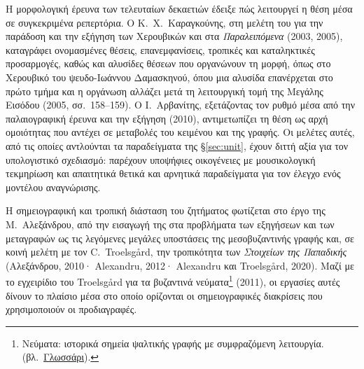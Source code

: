 \documentclass[a4paper]{article}
\newcommand{\musnote}[2]{\footnote{#2\enspace(βλ.~\hyperlink{gl:#1}{Γλωσσάρι}).}}
\begin{document}
Η μορφολογική έρευνα των τελευταίων δεκαετιών έδειξε πώς λειτουργεί η θέση μέσα σε συγκεκριμένα ρεπερτόρια. Ο Κ.~Χ.~Καραγκούνης, στη μελέτη του για την παράδοση και την εξήγηση των Χερουβικών και στα \emph{Παραλειπόμενα} (2003, 2005), καταγράφει ονομασμένες θέσεις, επανεμφανίσεις, τροπικές και καταληκτικές προσαρμογές, καθώς και αλυσίδες θέσεων που οργανώνουν τη μορφή, όπως στο Χερουβικό του ψευδο-Ιωάννου Δαμασκηνού, όπου μια αλυσίδα επανέρχεται στο πρώτο τμήμα και η οργάνωση αλλάζει μετά τη λειτουργική τομή της Μεγάλης Εισόδου (2005, σσ.~158--159). Ο Ι.~Αρβανίτης, εξετάζοντας τον ρυθμό μέσα από την παλαιογραφική έρευνα και την εξήγηση (2010), αντιμετωπίζει τη θέση ως αρχή ομοιότητας που αντέχει σε μεταβολές του κειμένου και της γραφής. Οι μελέτες αυτές, από τις οποίες αντλούνται τα παραδείγματα της §\ref{sec:unit}, έχουν διττή αξία για τον υπολογιστικό σχεδιασμό: παρέχουν υποψήφιες οικογένειες με μουσικολογική τεκμηρίωση και απαιτητικά θετικά και αρνητικά παραδείγματα για τον έλεγχο ενός μοντέλου αναγνώρισης.

Η σημειογραφική και τροπική διάσταση του ζητήματος φωτίζεται στο έργο της Μ.~Αλεξάνδρου, από την εισαγωγή της στα προβλήματα των εξηγήσεων και των μεταγραφών ως τις λεγόμενες μεγάλες υποστάσεις της μεσοβυζαντινής γραφής και, σε κοινή μελέτη με τον C.~Troelsgård, την τροπικότητα των \emph{Στοιχείων της Παπαδικής} (Αλεξάνδρου, 2010· Alexandru, 2012· Alexandru και Troelsgård, 2020). Μαζί με το εγχειρίδιο του Troelsgård για τα βυζαντινά νεύματα\musnote{neumes}{Νεύματα: ιστορικά σημεία ψαλτικής γραφής με συμφραζόμενη λειτουργία.} (2011), οι εργασίες αυτές δίνουν το πλαίσιο μέσα στο οποίο ορίζονται οι σημειογραφικές διακρίσεις που χρησιμοποιούν οι προδιαγραφές.
\end{document}
